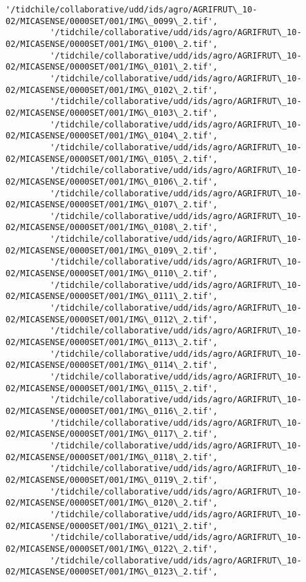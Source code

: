 \documentclass[11pt]{article}
\begin{document}
\begin{Verbatim}[commandchars=\\\{\}]
         '/tidchile/collaborative/udd/ids/agro/AGRIFRUT\_10-02/MICASENSE/0000SET/001/IMG\_0099\_2.tif',
         '/tidchile/collaborative/udd/ids/agro/AGRIFRUT\_10-02/MICASENSE/0000SET/001/IMG\_0100\_2.tif',
         '/tidchile/collaborative/udd/ids/agro/AGRIFRUT\_10-02/MICASENSE/0000SET/001/IMG\_0101\_2.tif',
         '/tidchile/collaborative/udd/ids/agro/AGRIFRUT\_10-02/MICASENSE/0000SET/001/IMG\_0102\_2.tif',
         '/tidchile/collaborative/udd/ids/agro/AGRIFRUT\_10-02/MICASENSE/0000SET/001/IMG\_0103\_2.tif',
         '/tidchile/collaborative/udd/ids/agro/AGRIFRUT\_10-02/MICASENSE/0000SET/001/IMG\_0104\_2.tif',
         '/tidchile/collaborative/udd/ids/agro/AGRIFRUT\_10-02/MICASENSE/0000SET/001/IMG\_0105\_2.tif',
         '/tidchile/collaborative/udd/ids/agro/AGRIFRUT\_10-02/MICASENSE/0000SET/001/IMG\_0106\_2.tif',
         '/tidchile/collaborative/udd/ids/agro/AGRIFRUT\_10-02/MICASENSE/0000SET/001/IMG\_0107\_2.tif',
         '/tidchile/collaborative/udd/ids/agro/AGRIFRUT\_10-02/MICASENSE/0000SET/001/IMG\_0108\_2.tif',
         '/tidchile/collaborative/udd/ids/agro/AGRIFRUT\_10-02/MICASENSE/0000SET/001/IMG\_0109\_2.tif',
         '/tidchile/collaborative/udd/ids/agro/AGRIFRUT\_10-02/MICASENSE/0000SET/001/IMG\_0110\_2.tif',
         '/tidchile/collaborative/udd/ids/agro/AGRIFRUT\_10-02/MICASENSE/0000SET/001/IMG\_0111\_2.tif',
         '/tidchile/collaborative/udd/ids/agro/AGRIFRUT\_10-02/MICASENSE/0000SET/001/IMG\_0112\_2.tif',
         '/tidchile/collaborative/udd/ids/agro/AGRIFRUT\_10-02/MICASENSE/0000SET/001/IMG\_0113\_2.tif',
         '/tidchile/collaborative/udd/ids/agro/AGRIFRUT\_10-02/MICASENSE/0000SET/001/IMG\_0114\_2.tif',
         '/tidchile/collaborative/udd/ids/agro/AGRIFRUT\_10-02/MICASENSE/0000SET/001/IMG\_0115\_2.tif',
         '/tidchile/collaborative/udd/ids/agro/AGRIFRUT\_10-02/MICASENSE/0000SET/001/IMG\_0116\_2.tif',
         '/tidchile/collaborative/udd/ids/agro/AGRIFRUT\_10-02/MICASENSE/0000SET/001/IMG\_0117\_2.tif',
         '/tidchile/collaborative/udd/ids/agro/AGRIFRUT\_10-02/MICASENSE/0000SET/001/IMG\_0118\_2.tif',
         '/tidchile/collaborative/udd/ids/agro/AGRIFRUT\_10-02/MICASENSE/0000SET/001/IMG\_0119\_2.tif',
         '/tidchile/collaborative/udd/ids/agro/AGRIFRUT\_10-02/MICASENSE/0000SET/001/IMG\_0120\_2.tif',
         '/tidchile/collaborative/udd/ids/agro/AGRIFRUT\_10-02/MICASENSE/0000SET/001/IMG\_0121\_2.tif',
         '/tidchile/collaborative/udd/ids/agro/AGRIFRUT\_10-02/MICASENSE/0000SET/001/IMG\_0122\_2.tif',
         '/tidchile/collaborative/udd/ids/agro/AGRIFRUT\_10-02/MICASENSE/0000SET/001/IMG\_0123\_2.tif',

\end{Verbatim}
\end{document}
